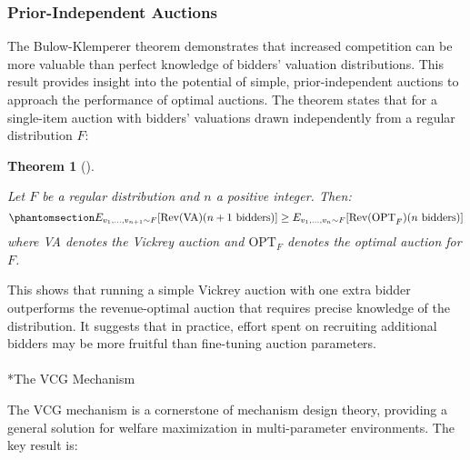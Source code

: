 \documentclass[
  letterpaper,
  numbers=noenddot,
  DIV=11]{scrreprt}
\makeatletter
\let\oldparagraph\paragraph
\renewcommand{\paragraph}{
    \@ifstar
      \xxxParagraphStar
      \xxxParagraphNoStar
  }
\newcommand{\xxxParagraphStar}[1]{\oldparagraph*{#1}\mbox{}}
\newcommand{\xxxParagraphNoStar}[1]{\oldparagraph{#1}\mbox{}}
\theoremstyle{definition}
\theoremstyle{plain}
\theoremstyle{plain}
\newtheorem{theorem}{Theorem}[chapter]
\theoremstyle{remark}
\makeatother
\begin{document}
\subsubsection*{Prior-Independent
Auctions}\label{prior-independent-auctions}

The Bulow-Klemperer theorem demonstrates that increased competition can
be more valuable than perfect knowledge of bidders' valuation
distributions. This result provides insight into the potential of
simple, prior-independent auctions to approach the performance of
optimal auctions. The theorem states that for a single-item auction with
bidders' valuations drawn independently from a regular distribution
\(F\):

\begin{tcolorbox}[colframe=.grey, title=\faPenSquare \enspace Theorem]

\begin{theorem}[]\protect\hypertarget{thm-bulow-klemperer}{}\label{thm-bulow-klemperer}

Let \(F\) be a regular distribution and \(n\) a positive integer. Then:
\begin{equation}\phantomsection\label{eq-eq3.64}{E_{v_1,\ldots,v_{n+1} \sim F}[\text{Rev(VA)}(n+1 \text{ bidders})] \geq E_{v_1,\ldots,v_n \sim F}[\text{Rev(OPT}_F)(n \text{ bidders})]}\end{equation}
where VA denotes the Vickrey auction and \(\text{OPT}_F\) denotes the
optimal auction for \(F\).

\end{theorem}

\end{tcolorbox}

This shows that running a simple Vickrey auction with one extra bidder
outperforms the revenue-optimal auction that requires precise knowledge
of the distribution. It suggests that in practice, effort spent on
recruiting additional bidders may be more fruitful than fine-tuning
auction parameters.

\paragraph*{The VCG Mechanism}\label{the-vcg-mechanism}

The VCG mechanism is a cornerstone of mechanism design theory, providing
a general solution for welfare maximization in multi-parameter
environments. The key result is:
\end{document}
